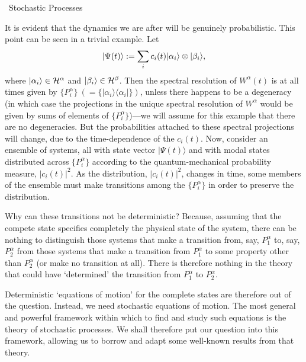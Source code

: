 \documentclass[12pt]{article}
\newcommand{\be}{\vspace*{6pt} \begin{equation}}
\newcommand{\ee}{\vspace*{10pt} \end{equation}}
\renewcommand{\subsection}[1]{\addtocounter{subsection}{1}
                           \setcounter{subsubsection}{0}
                           \vspace{20pt}
                           \begin{center}
                           \thesubsection \ #1
                           \end{center}
                           \vspace{20pt}}
\newcommand{\cH}{\cal{H}}                                       %
\newcommand{\ga}{\alpha}                                        %
\newcommand{\gb}{\beta}                                         %
\newcommand{\bra}[1]{\langle #1\vert}                           %
\newcommand{\ket}[1]{\vert #1\rangle}                           %
\begin{document}
\vspace{-30pt}

\subsection{Stochastic Processes}


It is evident that the dynamics we are after will be genuinely
probabilistic.  This point can be seen in a trivial example.  Let
\be
\ket{\Psi(t)}:=\sum_{i} c_{i}(t)\ket{\ga_{i}}\otimes \ket{\gb_{i}},
\ee
\noindent where $\ket{\ga_{i}} \in \cH^{\ga}$ and $\ket{\gb_{i}} \in
\cH^{\gb}$.  Then the spectral resolution of $W^{\ga}(t)$ is at all
times given by $\{P^{\ga}_{i}\}\ (= \{\ket{\ga_{i}}\bra{\ga_{i}}\})$,
unless there happens to be a degeneracy (in which case the projections
in the unique spectral resolution of $W^{\ga}$ would be given by sums
of elements of $\{P^{\ga}_{i}\}$)---we will assume for this example
that there are no degeneracies.  But the probabilities attached to
these spectral projections will change, due to the time-dependence of
the $c_{i}(t)$.  Now, consider an ensemble of systems, all with
state vector $\ket{\Psi(t)}$ and with modal states distributed across
$\{P^{\ga}_{i}\}$ according to the quantum-mechanical probability
measure, $|c_{i}(t)|^{2}$.  As the distribution, $|c_{i}(t)|^{2}$,
changes in time, some members of the ensemble must make transitions
among the $\{P^{\ga}_{i}\}$ in order to preserve the distribution.

Why can these transitions not be deterministic?  Because, assuming 
that the compete state specifies completely the physical state of the 
system, there can be nothing to distinguish those systems that make a 
transition from, say, $P^{\ga}_{1}$ to, say, $P^{\ga}_{2}$ from those 
systems that make a transition from $P^{\ga}_{1}$ to some property 
other than $P^{\ga}_{2}$ (or make no transition at all).  There is 
therefore nothing in the theory that could have `determined' the 
transition from $P^{\ga}_{1}$ to $P^{\ga}_{2}$.

Deterministic `equations of motion' for the complete states are 
therefore out of the question.  Instead, we need stochastic equations 
of motion.  The most general and powerful framework within which to 
find and study such equations is the theory of stochastic processes.  
We shall therefore put our question into this framework, allowing us 
to borrow and adapt some well-known results from that theory.
\end{document}
